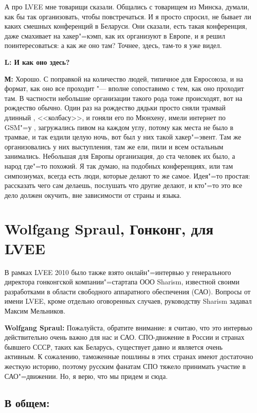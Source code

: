 \documentclass[10pt, a5paper]{article}
\begin{document}
А про LVEE мне товарищи сказали. Общались с товарищем из Минска, думали, как бы так организовать, чтобы повстречаться. И я просто спросил, не бывает ли каких смешных конференций в Беларуси. Они сказали, есть такая конференция, даже смахивает на хакер"=кэмп, как их организуют в Европе, и я решил поинтересоваться: а как же оно там? Точнее, здесь, там-то я уже видел. 

{\noindent \bf L: И как оно здесь?}

{\noindent \bf М:} Хорошо. С поправкой на количество людей, типичное для Евросоюза, и на формат, как оно все проходит "--- вполне сопоставимо с тем, как оно проходит там. В частности небольшие организации такого рода тоже происходят, вот на рождество обычно. Один раз на рождество дядьки просто сняли трамвай длинный , <<колбасу>>, и гоняли его по Мюнхену, имели интернет по GSM"=у , загружались пивом на каждом углу, потому как места не было в трамвае, и так ездили целую ночь, вот был у них такой хакер"=эвент. Там же организовались у них выступления, там же ели, пили и всем остальным занимались. Небольшая для Европы организация, до ста человек их было, а народ где"=то похожий. Я так думаю, на подобных конференциях, или там симпозиумах, всегда есть люди, которые делают то же самое. Идея"=то простая: рассказать чего сам делаешь, послушать что другие делают, и кто"=то это все дело должен окучить, вне зависимости от страны и языка.

\section{Wolfgang Spraul, Гонконг, для LVEE}

В рамках LVEE 2010 было также взято онлайн"=интервью у генерального директора гонконгской компании"=стартапа ООО Sharism, известной своими разработками в области свободного аппаратного обеспечения (САО). Вопросы от имени LVEE, кроме отдельно оговоренных случаев, руководству Sharism задавал Максим Мельников.

{\noindent \bf Wolfgang Spraul:} Пожалуйста, обратите внимание: я считаю, что это интервью действительно очень важно для нас и САО. СПО-движение в России и странах бывшего СССР, таких как Беларусь, существует давно и является очень активным. К сожалению, таможенные пошлины в этих странах имеют достаточно жесткую историю, поэтому русским фанатам СПО тяжело принимать участие в САО"=движении. Но, я верю, что мы придем и сюда.

\subsection*{В общем:}
\end{document}
